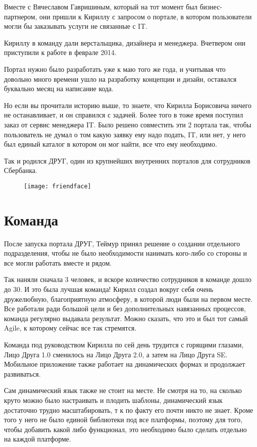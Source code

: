 \documentclass[../index.tex]{subfiles}
\begin{document}
Вместе с Вячеславом Гавришиным, который на тот момент был бизнес-партнером, они пришли к Кириллу с запросом о портале, в котором пользователи могли бы заказывать услуги не связанные с IT. 

Кириллу в команду дали верстальщика, дизайнера и менеджера. Вчетвером они приступили к работе в феврале 2014. 

Портал нужно было разработать уже к маю того же года, и учитывая что довольно много времени ушло на разработку концепции и дизайн, оставался буквально месяц на написание кода. 

Но если вы прочитали историю выше, то знаете, что Кирилла Борисовича ничего не останавливает, и он справился с задачей. Более того в тоже время поступил заказ от сервис менеджера IT.
Было решено совместить эти 2 портала так, чтобы пользователь не думал о том какую заявку ему надо подать, IT, или нет, у него был единый каталог в котором он мог найти, все что ему необходимо. 

Так и родился ДРУГ, один из крупнейших внутренних порталов для сотрудников Сбербанка.

\begin{figure}[H]
	\texttt{[image: friendface]}
	\centering
\end{figure}

\section{Команда}

После запуска портала ДРУГ, Теймур принял решение о создании отдельного подразделения, чтобы не было необходимости нанимать кого-либо со стороны и все могли работать вместе и рядом.  

Так наняли сначала 3 человек, и вскоре количество сотрудников в команде дошло до 30. И это была лучшая команда! Кирилл создал вокруг себя очень дружелюбную, благоприятную атмосферу, в которой люди были на первом месте. Все работали ради большой цели и без дополнительных навязанных процессов, команда регулярно выдавала результат.
Можно сказать, что это и был тот самый Agile, к которому сейчас все так стремятся. 

Команда под руководством Кирилла по сей день трудится с горящими глазами, Лицо Друга 1.0 сменилось на Лицо Друга 2.0, а затем на Лицо Друга SE. Мобильное приложение также работает на динамических формах и продолжает развиваться. 

Сам динамический язык также не стоит на месте. Не смотря на то, на сколько круто можно было настраивать и плодить шаблоны, динамический язык достаточно трудно масштабировать, т к по факту его почти никто не знает. Кроме того у него не было единой библиотеки под все платформы, поэтому для того, чтобы добавить какой либо функционал,  это необходимо было сделать отдельно на каждой платформе. 
\end{document}
